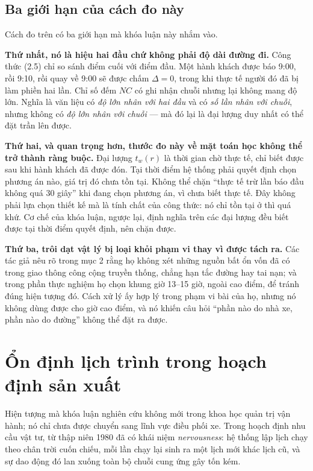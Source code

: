 \subsection{Ba giới hạn của cách đo này}

Cách đo trên có ba giới hạn mà khóa luận này nhắm vào.

\textbf{Thứ nhất, nó là hiệu hai đầu chứ không phải độ dài đường đi.} Công thức (2.5) chỉ so
sánh điểm cuối với điểm đầu. Một hành khách được báo 9:00, rồi 9:10, rồi quay về 9:00 sẽ được
chấm $\Delta = 0$, trong khi thực tế người đó đã bị làm phiền hai lần. Chỉ số đếm $NC$ có ghi
nhận chuỗi nhưng lại không mang độ lớn. Nghĩa là văn liệu có \emph{độ lớn nhân với hai đầu} và
có \emph{số lần nhân với chuỗi}, nhưng không có \emph{độ lớn nhân với chuỗi} --- mà đó lại là
đại lượng duy nhất có thể đặt trần lên được.

\textbf{Thứ hai, và quan trọng hơn, thước đo này về mặt toán học không thể trở thành ràng
buộc.} Đại lượng $t_w(r)$ là thời gian chờ thực tế, chỉ biết được sau khi hành khách đã được
đón. Tại thời điểm hệ thống phải quyết định chọn phương án nào, giá trị đó chưa tồn tại. Không
thể chặn ``thực tế trừ lần báo đầu không quá 30 giây'' khi đang chọn phương án, vì chưa biết
thực tế. Đây không phải lựa chọn thiết kế mà là tính chất của công thức: nó chỉ tồn tại ở thì
quá khứ. Cơ chế của khóa luận, ngược lại, định nghĩa trên các đại lượng đều biết được tại thời
điểm quyết định, nên chặn được.

\textbf{Thứ ba, trôi dạt vật lý bị loại khỏi phạm vi thay vì được tách ra.} Các tác giả nêu rõ
trong mục 2 rằng họ không xét những nguồn bất ổn vốn đã có trong giao thông công cộng truyền
thống, chẳng hạn tắc đường hay tai nạn; và trong phần thực nghiệm họ chọn khung giờ 13--15 giờ,
ngoài cao điểm, để tránh đúng hiện tượng đó. Cách xử lý ấy hợp lý trong phạm vi bài của họ,
nhưng nó không dùng được cho giờ cao điểm, và nó khiến câu hỏi ``phần nào do nhà xe, phần nào
do đường'' không thể đặt ra được.

\section{Ổn định lịch trình trong hoạch định sản xuất}

Hiện tượng mà khóa luận nghiên cứu không mới trong khoa học quản trị vận hành; nó chỉ chưa
được chuyển sang lĩnh vực điều phối xe. Trong hoạch định nhu cầu vật tư, từ thập niên 1980 đã
có khái niệm \emph{nervousness}: hệ thống lập lịch chạy theo chân trời cuốn chiếu, mỗi lần chạy
lại sinh ra một lịch mới khác lịch cũ, và sự dao động đó lan xuống toàn bộ chuỗi cung ứng gây
tốn kém.

